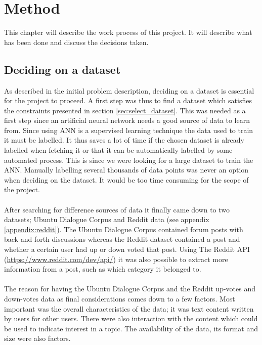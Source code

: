 \chapter{Method}
This chapter will describe the work process of this project. It will describe what has been done and discuss the decisions taken.

\section{Deciding on a dataset}\label{sec:deciding_dataset}
As described in the initial problem description, deciding on a dataset is essential for the project to proceed. A first step was thus to find a dataset which satisfies the constraints presented in section \ref{sec:select_dataset}. This was needed as a first step since an artificial neural network needs a good source of data to learn from. Since using ANN is a supervised learning technique the data used to train it must be labelled. It thus saves a lot of time if the chosen dataset is already labelled when fetching it or that it can be automatically labelled by some automated process. This is since we were looking for a large dataset to train the ANN. Manually labelling several thousands of data points was never an option when deciding on the dataset. It would be too time consuming for the scope of the project.
\\\\
After searching for difference sources of data it finally came down to two datasets; Ubuntu Dialogue Corpus \parencite{lowe2015ubuntu} and Reddit data (see appendix \ref{appendix:reddit}). The Ubuntu Dialogue Corpus contained forum posts with back and forth discussions whereas the Reddit dataset contained a post and whether a certain user had up or down voted that post. Using The Reddit API (\url{https://www.reddit.com/dev/api/}) it was also possible to extract more information from a post, such as which category it belonged to.
\\\\
The reason for having the Ubuntu Dialogue Corpus and the Reddit up-votes and down-votes data as final considerations comes down to a few factors. Most important was the overall characteristics of the data; it was text content written by users for other users. There were also interaction with the content which could be used to indicate interest in a topic. The availability of the data, its format and size were also factors.
\\\\
